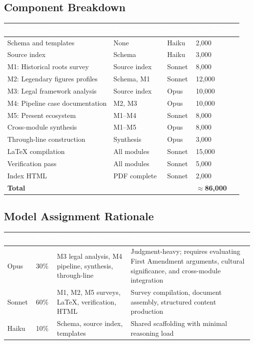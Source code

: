 \documentclass[11pt,letterpaper]{article}
\newcommand{\tableheader}[1]{\textbf{\sffamily\textcolor{white}{#1}}}
\begin{document}
\subsection{Component Breakdown}

\begin{center}
\begin{tabularx}{\textwidth}{L{3cm}L{3cm}C{2cm}C{2cm}}
\toprule
{}
\tableheader{Component} & \tableheader{Dependencies} & \tableheader{Model} & \tableheader{Est. Tokens} \\
\midrule
Schema and templates & None & Haiku & 2,000 \\
Source index & Schema & Haiku & 3,000 \\
M1: Historical roots survey & Source index & Sonnet & 8,000 \\
M2: Legendary figures profiles & Schema, M1 & Sonnet & 12,000 \\
M3: Legal framework analysis & Source index & Opus & 10,000 \\
M4: Pipeline case documentation & M2, M3 & Opus & 10,000 \\
M5: Present ecosystem & M1--M4 & Sonnet & 8,000 \\
Cross-module synthesis & M1--M5 & Opus & 8,000 \\
Through-line construction & Synthesis & Opus & 3,000 \\
LaTeX compilation & All modules & Sonnet & 15,000 \\
Verification pass & All modules & Sonnet & 5,000 \\
Index HTML & PDF complete & Sonnet & 2,000 \\
\midrule
\textbf{Total} & & & \textbf{$\approx$86,000} \\
\bottomrule
\end{tabularx}
\end{center}

\subsection{Model Assignment Rationale}

\begin{center}
\begin{tabularx}{\textwidth}{L{2cm}C{1.5cm}L{4cm}X}
\toprule
{}
\tableheader{Model} & \tableheader{Pct.} & \tableheader{Assigned To} & \tableheader{Rationale} \\
\midrule
Opus & 30\% & M3 legal analysis, M4 pipeline, synthesis, through-line & Judgment-heavy; requires evaluating First Amendment arguments, cultural significance, and cross-module integration \\
Sonnet & 60\% & M1, M2, M5 surveys, LaTeX, verification, HTML & Survey compilation, document assembly, structured content production \\
Haiku & 10\% & Schema, source index, templates & Shared scaffolding with minimal reasoning load \\
\bottomrule
\end{tabularx}
\end{center}
\end{document}
